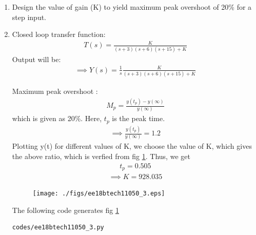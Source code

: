 \begin{enumerate}[label=\thesection.\arabic*.,ref=\thesection.\theenumi]
\item Design the value of gain (K) to yield maximum peak overshoot of 20\% for a step input.

\item \solution
Closed loop transfer function:
\begin{align}
    T(s) = \frac{K}{(s+3)(s+6)(s+15)+K}
    \label{eq:ee18btech11050_13}
\end{align}
Output will be:
\begin{align}
    \implies Y(s) = \frac{1}{s}\frac{K}{(s+3)(s+6)(s+15)+K}
    \label{eq:ee18btech11050_14}
\end{align}

Maximum peak overshoot :
\begin{align}
    M_p = \frac{y(t_p) - y(\infty)}{y(\infty)}
    \label{eq:ee18btech11050_15}
\end{align}
which is given as 20\%.
Here, $t_p$ is the peak time.
\begin{align}
    \implies \frac{y(t_p)}{y(\infty)} = 1.2
    \label{eq:ee18btech11050_18}
\end{align}
Plotting y(t) for different values of K, we choose the value of K, which gives the above ratio, which is verfied from fig \ref{fig:ee18btech11050_fig4}.
Thus, we get 
\begin{align}
    t_p = 0.505
    \label{eq:ee18btech11050_16}
\end{align}
\begin{align}
    \implies K = 928.035
    \label{eq:ee18btech11050_17}
\end{align}



\begin{figure}[!ht]
\centering
\texttt{[image: ./figs/ee18btech11050\_3.eps]}
\caption{}
\label{fig:ee18btech11050_fig4}
\end{figure}

The following code generates fig \ref{fig:ee18btech11050_fig4}
\begin{lstlisting}
codes/ee18btech11050_3.py
\end{lstlisting}

\end{enumerate}
